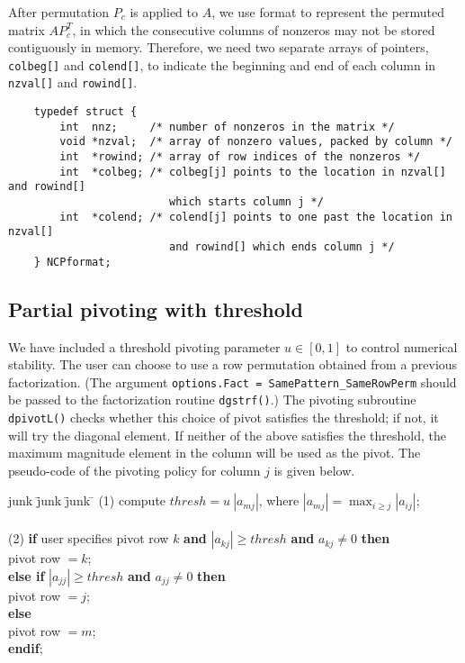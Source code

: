 After permutation $P_c$ is applied to $A$, we use {\NCP} format
to represent the permuted matrix $AP_c^T$, in which the consecutive 
columns of nonzeros may not be stored contiguously in memory.
Therefore, we need two separate arrays of pointers, {\tt colbeg[]} and 
{\tt colend[]}, to indicate the beginning and end of
each column in {\tt nzval[]} and {\tt rowind[]}.
\begin{verbatim}
    typedef struct {
        int  nnz;     /* number of nonzeros in the matrix */
        void *nzval;  /* array of nonzero values, packed by column */
        int  *rowind; /* array of row indices of the nonzeros */
        int  *colbeg; /* colbeg[j] points to the location in nzval[] and rowind[]
                         which starts column j */
        int  *colend; /* colend[j] points to one past the location in nzval[]
                         and rowind[] which ends column j */
    } NCPformat;
\end{verbatim}


\subsection{Partial pivoting with threshold}
We have included a threshold pivoting parameter $u\in [0,1]$ to control 
numerical stability. The user can choose to use a row permutation obtained
from a previous factorization. (The argument
{\tt options.Fact = SamePattern\_SameRowPerm} should be
passed to the factorization routine {\tt dgstrf()}.) 
The pivoting subroutine {\tt dpivotL()} checks whether this choice of pivot
satisfies the threshold; if not, it will try the diagonal element.
If neither of the above satisfies the threshold, 
the maximum magnitude element in the column will be used as the pivot.
The pseudo-code of the pivoting policy for column $j$ is given below.

\begin{tabbing}
junk \= junk \= junk \= \kill
\> (1)\> compute $thresh = u~|a_{mj}|$, where $|a_{mj}|=\max_{i\ge j}|a_{ij}|$;
\\ \\
\> (2)\> {\bf if} user specifies pivot row $k$ {\bf and}
                  $|a_{kj}|\ge thresh$ {\bf and} $a_{kj}\ne 0$ {\bf then} \\
\>    \> \>        pivot row $= k$; \\
\>    \>  {\bf else if } $|a_{jj}| \ge thresh$ 
                         {\bf and} $a_{jj}\ne 0$ {\bf then} \\
\>    \> \>        pivot row $= j$; \\
\>    \>  {\bf else} \\
\>    \> \>        pivot row $= m$; \\
\>    \>  {\bf endif};
\end{tabbing}

